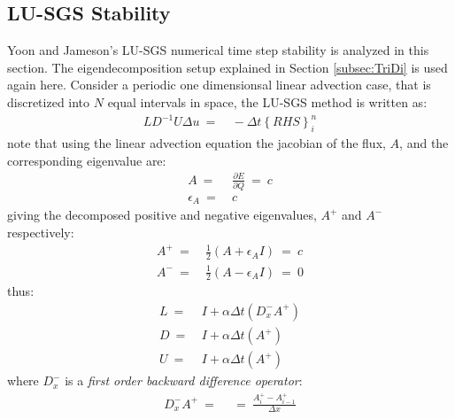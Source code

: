 \documentclass[conf]{new-aiaa}
\begin{document}
\subsection{LU-SGS Stability}
\label{subsec:LUSGS}
Yoon and Jameson's LU-SGS numerical time step stability is analyzed in this section. The eigendecomposition setup explained in Section \ref{subsec:TriDi} is used again here.
Consider a periodic one dimensionsal linear advection case, that is discretized into $N$ equal intervals in space, the LU-SGS method is written as:
\begin{equation}
	\begin{split}
	\label{eq:LSGSU_LAE}
		LD^{-1}U\Delta{u}~=&~-\Delta{t}\left\{RHS\right\}^{n}_i
	\end{split}
\end{equation}
note that using the linear advection equation the jacobian of the flux, $A$, and the corresponding eigenvalue are:
\begin{equation}
	\begin{split}
		\label{eq:FluxJac_Eig}
  			A~=&~\frac{\partial{E}}{\partial{Q}}~=~c \\
  			\epsilon_A~=&~c
	\end{split}
\end{equation}
giving the decomposed positive and negative eigenvalues, $A^+$ and $A^-$ respectively:
\begin{equation}
	\begin{split}
		\label{eq:A_Plus_Minus}
  			A^{+}~=&~\frac{1}{2}\left(A+\epsilon_AI\right)~=~c \\
  			A^{-}~=&~\frac{1}{2}\left(A-\epsilon_AI\right)~=~0
	\end{split}
\end{equation}
thus:
\begin{equation}
	\label{eq:LDU}
	\begin{split}
            L~=&~I + \alpha\Delta{t}\left(D_x^-A^+\right)\\
		D~=&~I + \alpha\Delta{t}\left(A^+\right) \\
		U~=&~I + \alpha\Delta{t}\left(A^+\right)
	\end{split}
\end{equation}
where $D_x^-$ is a \textit{first order backward difference operator}:
\begin{equation}
	\begin{split}
		\label{eq:First_Order Difference}
  			D_x^-{A^+}~=&~
  			~=~\frac{{A}^{+}_{i}-{A}^{+}_{i-1}}{\Delta{x}}
	\end{split}
\end{equation}
\end{document}
